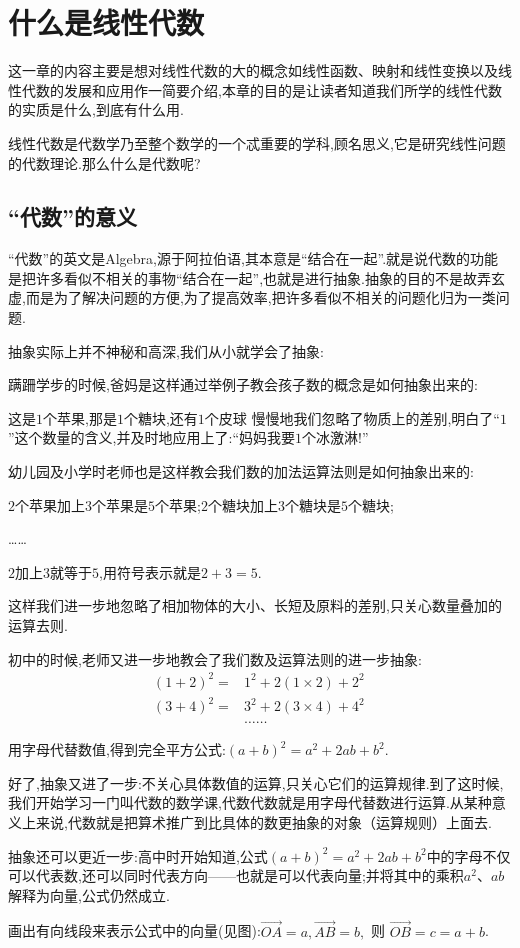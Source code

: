 \chapter{什么是线性代数}

这一章的内容主要是想对线性代数的大的概念如线性函数、映射和线性变换以及线性代数的发展和应用作一简要介绍,本章的目的是让读者知道我们所学的线性代数的实质是什么,到底有什么用.

线性代数是代数学乃至整个数学的一个忒重要的学科,顾名思义,它是研究线性问题的代数理论.那么什么是代数呢?

\section{``代数''的意义}
``代数''的英文是Algebra,源于阿拉伯语,其本意是``结合在一起''.就是说代数的功能是把许多看似不相关的事物``结合在一起'',也就是进行抽象.抽象的目的不是故弄玄虚,而是为了解决问题的方便,为了提高效率,把许多看似不相关的问题化归为一类问题.

抽象实际上并不神秘和高深,我们从小就学会了抽象:

蹒跚学步的时候,爸妈是这样通过举例子教会孩子数的概念是如何抽象出来的:

这是$1$个苹果,那是$1$个糖块,还有$1$个皮球 慢慢地我们忽略了物质上的差别,明白了``$1$''这个数量的含义,并及时地应用上了:``妈妈我要$1$个冰激淋!''

幼儿园及小学时老师也是这样教会我们数的加法运算法则是如何抽象出来的:

$2$个苹果加上$3$个苹果是$5$个苹果;$2$个糖块加上$3$个糖块是$5$个糖块;

……

$2$加上$3$就等于$5$,用符号表示就是$2+3=5$.

这样我们进一步地忽略了相加物体的大小、长短及原料的差别,只关心数量叠加的运算去则.

初中的时候,老师又进一步地教会了我们数及运算法则的进一步抽象:
$$\begin{aligned}
    (1+2)^{2}=&1^{2}+2(1 \times 2)+2^{2}\, \\
    (3+4)^{2}=&3^{2}+2(3 \times 4)+4^{2}\, \\
    &……
    \end{aligned}$$

用字母代替数值,得到完全平方公式:$(a+b)^{2}=a^{2}+2 a b+b^{2}$.

好了,抽象又进了一步:不关心具体数值的运算,只关心它们的运算规律.到了这时候,我们开始学习一门叫代数的数学课,代数代数就是用字母代替数进行运算.从某种意义上来说,代数就是把算术推广到比具体的数更抽象的对象（运算规则）上面去.

抽象还可以更近一步:高中时开始知道,公式$(a+b)^{2}=a^{2}+2 a b+b^{2}$中的字母不仅可以代表数,还可以同时代表方向——也就是可以代表向量;并将其中的乘积$a^2$、$ab$解释为向量,公式仍然成立.

画出有向线段来表示公式中的向量(见图):$\overrightarrow{O A}=a, \overrightarrow{A B}=b,$ 则 $\overrightarrow{O B}=c=a+b$.
